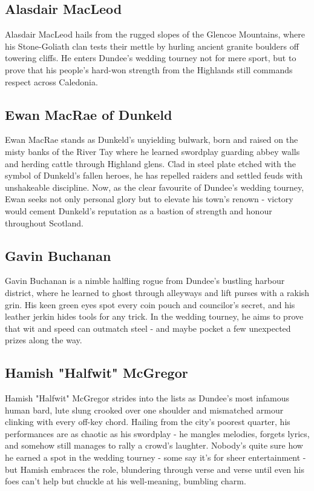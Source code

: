 \subsection{Alasdair MacLeod}\label{char:AlasdairMacLeod}
{\entryfont Alasdair MacLeod hails from the rugged slopes of the Glencoe Mountains, where his Stone-Goliath clan tests their mettle by hurling ancient granite boulders off towering cliffs. He enters Dundee's wedding tourney not for mere sport, but to prove that his people's hard-won strength from the Highlands still commands respect across Caledonia.}

\vfill\eject
\subsection{Ewan MacRae of Dunkeld}\label{char:EwanMacRae}
{\entryfont Ewan MacRae stands as Dunkeld's unyielding bulwark, born and raised on the misty banks of the River Tay where he learned swordplay guarding abbey walls and herding cattle through Highland glens. Clad in steel plate etched with the symbol of Dunkeld's fallen heroes, he has repelled raiders and settled feuds with unshakeable discipline. Now, as the clear favourite of Dundee's wedding tourney, Ewan seeks not only personal glory but to elevate his town's renown - victory would cement Dunkeld's reputation as a bastion of strength and honour throughout Scotland.}

\vfill\eject
\subsection{Gavin Buchanan}\label{char:GavinBuchanan}
{\entryfont Gavin Buchanan is a nimble halfling rogue from Dundee's bustling harbour district, where he learned to ghost through alleyways and lift purses with a rakish grin. His keen green eyes spot every coin pouch and councilor's secret, and his leather jerkin hides tools for any trick. In the wedding tourney, he aims to prove that wit and speed can outmatch steel - and maybe pocket a few unexpected prizes along the way.}

\vfill\eject
\subsection{Hamish "Halfwit" McGregor}\label{char:HamishMcGregor}
{\entryfont Hamish "Halfwit" McGregor strides into the lists as Dundee's most infamous human bard, lute slung crooked over one shoulder and mismatched armour clinking with every off-key chord. Hailing from the city's poorest quarter, his performances are as chaotic as his swordplay - he mangles melodies, forgets lyrics, and somehow still manages to rally a crowd's laughter. Nobody's quite sure how he earned a spot in the wedding tourney - some say it's for sheer entertainment - but Hamish embraces the role, blundering through verse and verse until even his foes can't help but chuckle at his well-meaning, bumbling charm.}

\vfill\eject
